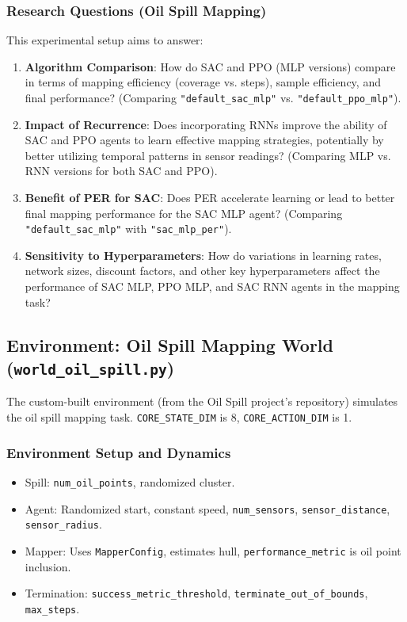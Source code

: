 \documentclass[11pt,a4paper]{article}
\newcommand{\code}[1]{\texttt{#1}} %
\begin{document}
\subsubsection{Research Questions (Oil Spill Mapping)}
This experimental setup aims to answer:
\begin{enumerate}
    \item \textbf{Algorithm Comparison}: How do SAC and PPO (MLP versions) compare in terms of mapping efficiency (coverage vs. steps), sample efficiency, and final performance? (Comparing \code{"default\_sac\_mlp"} vs. \code{"default\_ppo\_mlp"}).
    \item \textbf{Impact of Recurrence}: Does incorporating RNNs improve the ability of SAC and PPO agents to learn effective mapping strategies, potentially by better utilizing temporal patterns in sensor readings? (Comparing MLP vs. RNN versions for both SAC and PPO).
    \item \textbf{Benefit of PER for SAC}: Does PER accelerate learning or lead to better final mapping performance for the SAC MLP agent? (Comparing \code{"default\_sac\_mlp"} with \code{"sac\_mlp\_per"}).
    \item \textbf{Sensitivity to Hyperparameters}: How do variations in learning rates, network sizes, discount factors, and other key hyperparameters affect the performance of SAC MLP, PPO MLP, and SAC RNN agents in the mapping task?
\end{enumerate}

\subsection{Environment: Oil Spill Mapping World (\code{world\_oil\_spill.py})}
The custom-built environment (from the Oil Spill project's repository) simulates the oil spill mapping task. \code{CORE\_STATE\_DIM} is 8, \code{CORE\_ACTION\_DIM} is 1.

\subsubsection{Environment Setup and Dynamics}
\begin{itemize}
    \item Spill: \code{num\_oil\_points}, randomized cluster.
    \item Agent: Randomized start, constant speed, \code{num\_sensors}, \code{sensor\_distance}, \code{sensor\_radius}.
    \item Mapper: Uses \code{MapperConfig}, estimates hull, \code{performance\_metric} is oil point inclusion.
    \item Termination: \code{success\_metric\_threshold}, \code{terminate\_out\_of\_bounds}, \code{max\_steps}.
\end{itemize}
\end{document}
